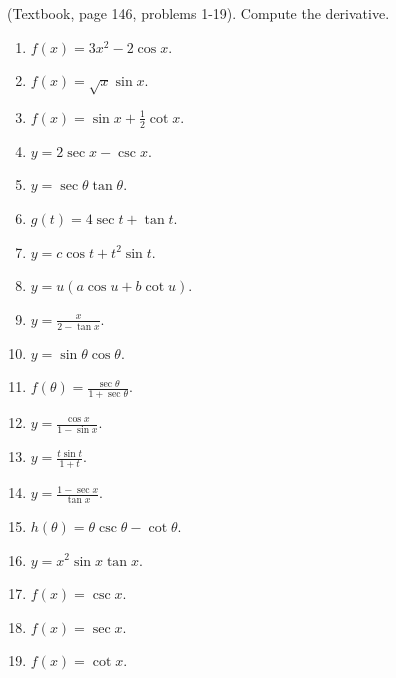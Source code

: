 
\begin{problem}(Textbook, page 146, problems 1-19).
Compute the derivative.
\begin{multicols}{3}
\begin{enumerate}
\item $f(x)= 3x^2 -2 \cos x$.
\item $f(x)=\sqrt{x}\sin x$.
\item $f(x)=\sin x +\frac{1}{2}\cot x$.
\item $y=2\sec x - \csc x$.
\item $y=\sec \theta \tan \theta$.
\item $g(t)=4 \sec t + \tan t$.
\item $y= c\cos t + t^2\sin t$.
\item $y=u(a\cos u + b \cot u)$.
\item $y=\frac{x}{2-\tan x}$.
\item $y=\sin \theta \cos \theta$.
\item $f(\theta)=\frac{\sec \theta}{1+\sec \theta}$.
\item $y=\frac{\cos x}{1-\sin x}$.
\item $y=\frac{t\sin t}{1+t}$.
\item $y=\frac{1-\sec x}{\tan x}$.
\item $h(\theta)=\theta \csc \theta -\cot \theta$.
\item $y=x^2\sin x\tan x$.
\item $f(x)=\csc x$.
\item $f(x)=\sec x$.
\item $f(x)=\cot x$.
\end{enumerate}
\end{multicols}
\end{problem}